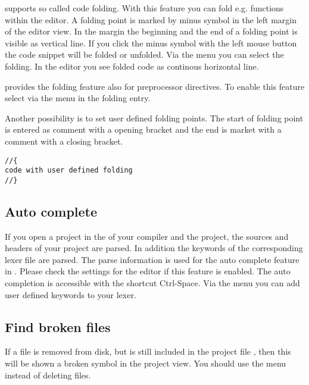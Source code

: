 \codeblocks supports so called code folding. With this feature you can fold e.g. functions within the \codeblocks editor. A folding point is marked by minus symbol in the left margin of
the editor view. In the margin the beginning and the end of a folding point is visible as vertical line. If you click the minus symbol with the left mouse button the code snippet will be folded or unfolded. Via the menu  you can select the folding. In the editor you see folded code as continous horizontal line.


\codeblocks provides the folding feature also for preprocessor directives. To enable this feature select  via the menu  in the folding entry.

Another possibility is to set user defined folding points. The start of folding point is entered as comment with a opening bracket and the end is market with a comment with a closing bracket.

\begin{verbatim}
//{
code with user defined folding
//}
\end{verbatim}

\subsection{Auto complete}

If you open a project in \codeblocks the  of your compiler and the project, the sources and headers of your project are parsed. In addition the keywords of the corresponding lexer file are parsed. The parse information is used for the auto complete feature in \codeblocks. Please check the settings for the editor if this feature is enabled. The auto completion is accessible with the shortcut Ctrl-Space. Via the menu  you can add user defined keywords to your lexer.

\subsection{Find broken files}

If a file is removed from disk, but is still included in the project file , then this  will be shown a broken symbol in the project view. You should use the menu  instead of deleting files.

